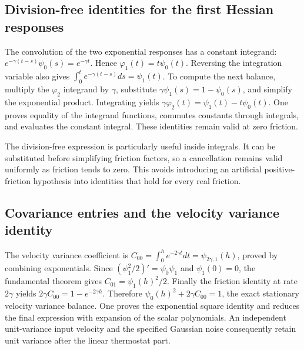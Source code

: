 \documentclass[11pt,a4paper]{report}
\begin{document}
\subsection{\texorpdfstring{Division-free identities for the first Hessian responses}{Division-free identities for the first Hessian responses}}
\label{report-step-KineticLangevin-Coefficients-lean-12}


The convolution of the two exponential responses has a constant integrand: \(e^{-\gamma(t-s)}\psi_0(s)=e^{-\gamma t}\). Hence \(\varphi_1(t)=t\psi_0(t)\). Reversing the integration variable also gives \(\int_0^te^{-\gamma(t-s)}ds=\psi_1(t)\). To compute the next balance, multiply the \(\varphi_2\) integrand by \(\gamma\), substitute \(\gamma\psi_1(s)=1-\psi_0(s)\), and simplify the exponential product. Integrating yields \(\gamma\varphi_2(t)=\psi_1(t)-t\psi_0(t)\). One proves equality of the integrand functions, commutes constants through integrals, and evaluates the constant integral. These identities remain valid at zero friction.



The division-free expression is particularly useful inside integrals. It can be substituted before simplifying friction factors, so a cancellation remains valid uniformly as friction tends to zero. This avoids introducing an artificial positive-friction hypothesis into identities that hold for every real friction.

\subsection{\texorpdfstring{Covariance entries and the velocity variance identity}{Covariance entries and the velocity variance identity}}
\label{report-step-KineticLangevin-Coefficients-lean-13}


The velocity variance coefficient is \(C_{00}=\int_0^he^{-2\gamma t}dt=\psi_{2\gamma,1}(h)\), proved by combining exponentials. Since \((\psi_1^2/2)'=\psi_0\psi_1\) and \(\psi_1(0)=0\), the fundamental theorem gives \(C_{01}=\psi_1(h)^2/2\). Finally the friction identity at rate \(2\gamma\) yields \(2\gamma C_{00}=1-e^{-2\gamma h}\). Therefore \(\psi_0(h)^2+2\gamma C_{00}=1\), the exact stationary velocity variance balance. One proves the exponential square identity and reduces the final expression with expansion of the scalar polynomials. An independent unit-variance input velocity and the specified Gaussian noise consequently retain unit variance after the linear thermostat part.
\end{document}
